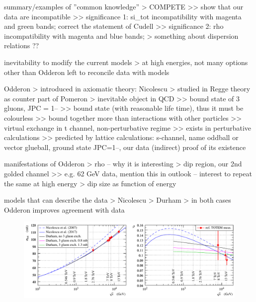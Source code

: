 \bgroup
\parskip=0pt

\> summary/examples of ''common knowledge''
\>> COMPETE
\>>> show that our data are incompatible
\>>> significance 1: si\_tot incompatibility with magenta and green bands; correct the statement of Cudell
\>>> significance 2: rho incompatibility with magenta and blue bands;
\>> something about dispersion relations ??

\> inevitability to modify the current models
\>> at high energies, not many options other than Odderon left to reconcile data with models

\> Odderon
\>> introduced in axiomatic theory: Nicolescu
\>> studied in Regge theory as counter part of Pomeron
\>> inevitable object in QCD 
\>>> bound state of 3 gluons, JPC = 1--
\>>> bound state (with reasonable life time), thus it must be colourless
\>>> bound together more than interactions with other particles
\>>> virtual exchange in t channel, non-perturbative regime
\>>> exists in perturbative calculations
\>>> predicted by lattice calculations: s-channel, name oddball or vector glueball, ground state JPC=1--, our data (indirect) proof of its existence

\> manifestations of Odderon
\>> rho -- why it is interesting
\>> dip region, our 2nd golded channel
\>>> e.g. 62 GeV data, mention this in outlook -- interest to repeat the same at high energy
\>> dip size as function of energy

\> models that can describe the data
\>> Nicolescu
\>> Durham
\>> in both cases Odderon improves agreement with data


\egroup






\begin{figure}
\vskip-5mm
\begin{center}
\includegraphics{fig/matching_models_si_tot_rho.pdf}
\caption{%
}
\label{fig:match models}
\end{center}
\end{figure}
